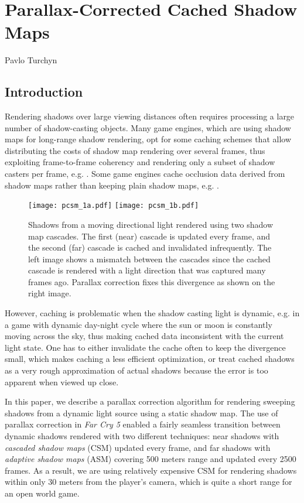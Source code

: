 \chapter{Parallax-Corrected Cached Shadow Maps}{Pavlo Turchyn}
 \label{Turchyn-chapter}

\section{Introduction}

Rendering shadows over large viewing distances often requires 
processing a large number of shadow-casting objects. Many game
engines, which are using shadow maps for long-range shadow rendering,
opt for some caching schemes that allow distributing the costs of shadow 
map rendering over several frames, thus exploiting frame-to-frame
coherency and rendering only a subset of shadow casters per frame,
e.g. \cite{CrytekRyse}\cite{CSMScrolling}. Some game engines cache occlusion data 
derived from shadow maps rather than keeping plain shadow maps, e.g. 
\cite{ShadowsInGames}\cite{WitcherTerrain}. 

\begin{figure}[h]
\texttt{[image: pcsm\_1a.pdf]}\label{Teaser:a}\hfill
\texttt{[image: pcsm\_1b.pdf]}\label{Teaser:b}
\caption{\small Shadows from a moving directional light rendered using two shadow map cascades. 
The first (near) cascade is updated every frame, and the second (far) cascade is cached 
and invalidated infrequently. The left image shows a mismatch 
between the cascades since the cached cascade is rendered
with a light direction that was captured many frames ago. Parallax correction fixes this divergence as shown
on the right image.}
\label{Fig:Teaser}
\end{figure}

However, caching is problematic when the shadow casting light is dynamic,
e.g. in a game with dynamic day-night cycle where the sun or moon is constantly 
moving across the sky, thus making cached data inconsistent with the current light
state. One has to either invalidate
the cache often to keep the divergence small, which makes caching a less
efficient optimization, or treat cached shadows as a very rough approximation of 
actual shadows because the error is too apparent when viewed up close.

In this paper, we describe a parallax correction algorithm for rendering 
sweeping shadows from a dynamic light source using a static shadow map. 
The use of parallax correction in \textit{Far Cry 5} enabled a fairly seamless
transition between dynamic shadows rendered with two different techniques:
near shadows with \textit{cascaded shadow maps} (CSM) updated every frame, and far shadows 
with \textit{adaptive shadow maps} (ASM) covering 500 meters range and updated every 2500 frames.
As a result, we are using relatively expensive CSM for rendering shadows within
only 30 meters from the player's camera, which is quite a short range for an open world game.

